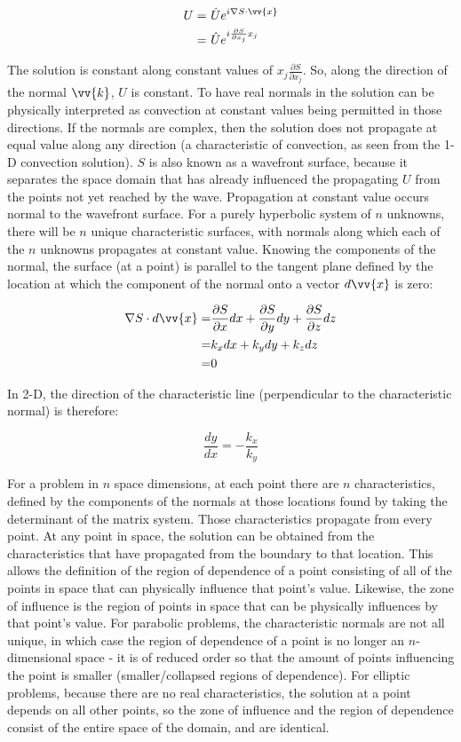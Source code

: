 \documentclass[10pt]{article}
\newcommand{\beq}{\begin{equation}}
\newcommand{\eeq}{\end{equation}}
\newcommand{\beqa}{\begin{equation}\begin{aligned}}
\newcommand{\eeqa}{\end{aligned}\end{equation}}
\begin{document}
\begin{flushleft}
\beqa
U=&\ \hat{U}e^{i\nabla S\cdot\vv{x}}\\
=&\ \hat{U}e^{i\frac{\partial S}{\partial x_j}x_j}
\eeqa

The solution is constant along constant values of \(x_j\frac{\partial S}{\partial x_j}\). So, along the direction of the normal \(\vv{k}\), \(U\) is constant. To have real normals in the solution can be physically interpreted as convection at constant values being permitted in those directions. If the normals are complex, then the solution does not propagate at equal value along any direction (a characteristic of convection, as seen from the 1-D convection solution). \(S\) is also known as a wavefront surface, because it separates the space domain that has already influenced the propagating \(U\) from the points not yet reached by the wave. Propagation at constant value occurs normal to the wavefront surface. For a purely hyperbolic system of \(n\) unknowns, there will be \(n\) unique characteristic surfaces, with normals along which each of the \(n\) unknowns propagates at constant value. Knowing the components of the normal, the surface (at a point) is parallel to the tangent plane defined by the location at which the component of the normal onto a vector \(d\vv{x}\) is zero:

\beqa
\nabla S\cdot d\vv{x}=&\frac{\partial S}{\partial x}dx+\frac{\partial S}{\partial y}dy+\frac{\partial S}{\partial z}dz\\
=&k_xdx+k_ydy+k_zdz\\
=&0
\eeqa

In 2-D, the direction of the characteristic line (perpendicular to the characteristic normal) is therefore:

\beq
\frac{dy}{dx}=-\frac{k_x}{k_y}
\eeq

For a problem in \(n\) space dimensions, at each point there are \(n\) characteristics, defined by the components of the normals at those locations found by taking the determinant of the matrix system. Those characteristics propagate from every point. At any point in space, the solution can be obtained from the characteristics that have propagated from the boundary to that location. This allows the definition of the region of dependence of a point consisting of all of the points in space that can physically influence that point's value. Likewise, the zone of influence is the region of points in space that can be physically influences by that point's value. For parabolic problems, the characteristic normals are not all unique, in which case the region of dependence of a point is no longer an \(n\)-dimensional space - it is of reduced order so that the amount of points influencing the point is smaller (smaller/collapsed regions of dependence). For elliptic problems, because there are no real characteristics, the solution at a point depends on all other points, so the zone of influence and the region of dependence consist of the entire space of the domain, and are identical.


\end{flushleft}
\end{document}
